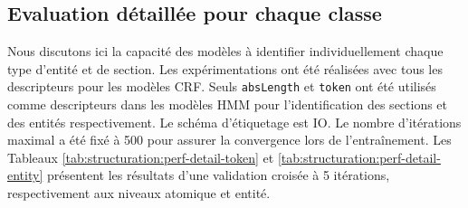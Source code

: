 \subsection{Evaluation détaillée pour chaque classe}
Nous discutons ici la capacité des modèles à identifier individuellement chaque type d'entité et de section. Les expérimentations ont été réalisées avec tous les descripteurs pour les modèles CRF. Seuls \verb|absLength| et \verb|token| ont été utilisés comme descripteurs dans les modèles HMM pour l'identification des sections et des entités respectivement. Le schéma d'étiquetage est IO. Le nombre d'itérations maximal a été fixé à 500 pour assurer la convergence lors de l'entraînement. Les Tableaux \ref{tab:structuration:perf-detail-token} et \ref{tab:structuration:perf-detail-entity} présentent les résultats d'une validation croisée à 5 itérations, respectivement aux niveaux atomique et entité. 

